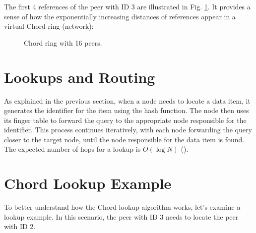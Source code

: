 The first 4 references of the peer with ID 3 are illustrated in Fig. \ref{fig:chord-ring-16-peers-4-references-peer-3}.
It provides a sense of how the exponentially increasing distances of references appear in a virtual Chord ring (network):

\begin{figure}[htbp]
    \centering
    \caption{Chord ring with 16 peers.}
    \label{fig:chord-ring-16-peers-4-references-peer-3}
\end{figure}

\section{Lookups and Routing}
As explained in the previous section, when a node needs to locate a data item, it generates the identifier for the item using the hash function.
The node then uses its finger table to forward the query to the appropriate node responsible for the identifier.
This process continues iteratively, with each node forwarding the query closer to the target node, until the node responsible for the data item is found.
The expected number of hops for a lookup is \(O(\log N)\) (\cite{stoica2001}).

\section{Chord Lookup Example}
To better understand how the Chord lookup algorithm works, let's examine a lookup example.
In this scenario, the peer with ID 3 needs to locate the peer with ID 2.

